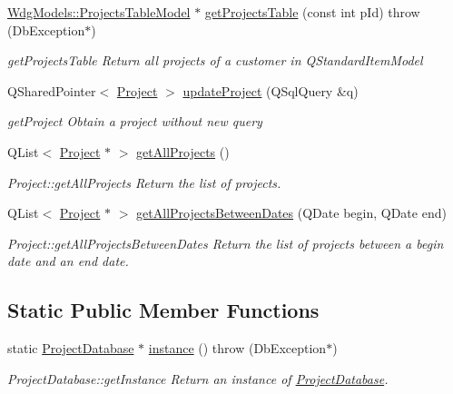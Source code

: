 \begin{DoxyCompactItemize}
\hyperlink{classGui_1_1Widgets_1_1WdgModels_1_1ProjectsTableModel}{Wdg\-Models\-::\-Projects\-Table\-Model} $\ast$ \hyperlink{classDatabases_1_1ProjectDatabase_ac00628f2d8911298dcb0292f6c4cff66}{get\-Projects\-Table} (const int p\-Id)  throw (\-Db\-Exception$\ast$)
\begin{DoxyCompactList}\small\item\em get\-Projects\-Table Return all projects of a customer in Q\-Standard\-Item\-Model \end{DoxyCompactList}\item 
Q\-Shared\-Pointer$<$ \hyperlink{classModels_1_1Project}{Project} $>$ \hyperlink{classDatabases_1_1ProjectDatabase_ab644aeb47d9666e8191cc9bc6ab93417}{update\-Project} (Q\-Sql\-Query \&q)
\begin{DoxyCompactList}\small\item\em get\-Project Obtain a project without new query \end{DoxyCompactList}\item 
Q\-List$<$ \hyperlink{classModels_1_1Project}{Project} $\ast$ $>$ \hyperlink{classDatabases_1_1ProjectDatabase_ac2532676aabcc8f304b2a3ddf4892205}{get\-All\-Projects} ()
\begin{DoxyCompactList}\small\item\em Project\-::get\-All\-Projects Return the list of projects. \end{DoxyCompactList}\item 
Q\-List$<$ \hyperlink{classModels_1_1Project}{Project} $\ast$ $>$ \hyperlink{classDatabases_1_1ProjectDatabase_af3e7ce373c57fec37c0437e351a7e1e4}{get\-All\-Projects\-Between\-Dates} (Q\-Date begin, Q\-Date end)
\begin{DoxyCompactList}\small\item\em Project\-::get\-All\-Projects\-Between\-Dates Return the list of projects between a {\itshape begin} date and an {\itshape end} date. \end{DoxyCompactList}\end{DoxyCompactItemize}
\subsection*{Static Public Member Functions}
\begin{DoxyCompactItemize}
\item 
static \hyperlink{classDatabases_1_1ProjectDatabase}{Project\-Database} $\ast$ \hyperlink{classDatabases_1_1ProjectDatabase_a75cf81b8d073addcf43a313483dafe65}{instance} ()  throw (\-Db\-Exception$\ast$)
\begin{DoxyCompactList}\small\item\em Project\-Database\-::get\-Instance Return an instance of \hyperlink{classDatabases_1_1ProjectDatabase}{Project\-Database}. \end{DoxyCompactList}\end{DoxyCompactItemize}
